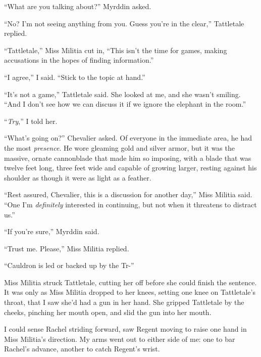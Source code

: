 ``What are you talking about?''  Myrddin asked.



``No?  I'm not seeing anything from you.  Guess you're in the clear,'' Tattletale replied.



``Tattletale,'' Miss Militia cut in, ``This isn't the time for games, making accusations in the hopes of finding information.''



``I agree,'' I said.  ``Stick to the topic at hand.''



``It's not a game,'' Tattletale said.  She looked at me, and she wasn't smiling.  ``And I don't see how we can discuss it if we ignore the elephant in the room.''



``\emph{Try},'' I told her.



``What's going on?'' Chevalier asked.  Of everyone in the immediate area, he had the most \emph{presence}.  He wore gleaming gold and silver armor, but it was the massive, ornate cannonblade that made him so imposing, with a blade that was twelve feet long, three feet wide and capable of growing larger, resting against his shoulder as though it were as light as a feather.



``Rest assured, Chevalier, this is a discussion for another day,'' Miss Militia said.  ``One I'm \emph{definitely} interested in continuing, but not when it threatens to distract us.''



``If you're sure,'' Myrddin said.



``Trust me.  Please,'' Miss Militia replied.



``Cauldron is led or backed up by the Tr-''



Miss Militia struck Tattletale, cutting her off before she could finish the sentence.  It was only as Miss Militia dropped to her knees, setting one knee on Tattletale's throat, that I saw she'd had a gun in her hand.  She gripped Tattletale by the cheeks, pinching her mouth open, and slid the gun into her mouth.



I could sense Rachel striding forward, saw Regent moving to raise one hand in Miss Militia's direction.  My arms went out to either side of me: one to bar Rachel's advance, another to catch Regent's wrist.



